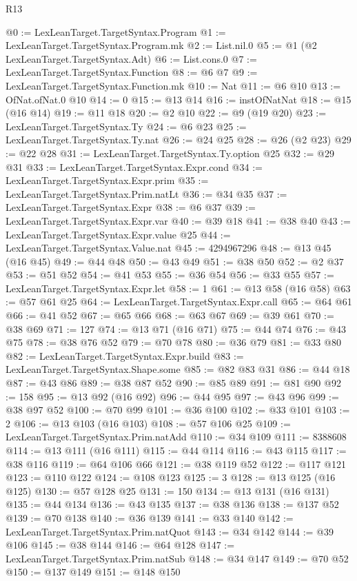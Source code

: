 \begin{lexlean}{R13}
\begin{coremodule}
@0 := LexLeanTarget.TargetSyntax.Program
@1 := LexLeanTarget.TargetSyntax.Program.mk
@2 := List.nil.{0}
@5 := @1 (@2 LexLeanTarget.TargetSyntax.Adt)
@6 := List.cons.{0}
@7 := LexLeanTarget.TargetSyntax.Function
@8 := @6 @7
@9 := LexLeanTarget.TargetSyntax.Function.mk
@10 := Nat
@11 := @6 @10
@13 := OfNat.ofNat.{0} @10
@14 := 0
@15 := @13 @14
@16 := instOfNatNat
@18 := @15 (@16 @14)
@19 := @11 @18
@20 := @2 @10
@22 := @9 (@19 @20)
@23 := LexLeanTarget.TargetSyntax.Ty
@24 := @6 @23
@25 := LexLeanTarget.TargetSyntax.Ty.nat
@26 := @24 @25
@28 := @26 (@2 @23)
@29 := @22 @28
@31 := LexLeanTarget.TargetSyntax.Ty.option @25
@32 := @29 @31
@33 := LexLeanTarget.TargetSyntax.Expr.cond
@34 := LexLeanTarget.TargetSyntax.Expr.prim
@35 := LexLeanTarget.TargetSyntax.Prim.natLt
@36 := @34 @35
@37 := LexLeanTarget.TargetSyntax.Expr
@38 := @6 @37
@39 := LexLeanTarget.TargetSyntax.Expr.var
@40 := @39 @18
@41 := @38 @40
@43 := LexLeanTarget.TargetSyntax.Expr.value @25
@44 := LexLeanTarget.TargetSyntax.Value.nat
@45 := 4294967296
@48 := @13 @45 (@16 @45)
@49 := @44 @48
@50 := @43 @49
@51 := @38 @50
@52 := @2 @37
@53 := @51 @52
@54 := @41 @53
@55 := @36 @54
@56 := @33 @55
@57 := LexLeanTarget.TargetSyntax.Expr.let
@58 := 1
@61 := @13 @58 (@16 @58)
@63 := @57 @61 @25
@64 := LexLeanTarget.TargetSyntax.Expr.call
@65 := @64 @61
@66 := @41 @52
@67 := @65 @66
@68 := @63 @67
@69 := @39 @61
@70 := @38 @69
@71 := 127
@74 := @13 @71 (@16 @71)
@75 := @44 @74
@76 := @43 @75
@78 := @38 @76 @52
@79 := @70 @78
@80 := @36 @79
@81 := @33 @80
@82 := LexLeanTarget.TargetSyntax.Expr.build
@83 := LexLeanTarget.TargetSyntax.Shape.some
@85 := @82 @83 @31
@86 := @44 @18
@87 := @43 @86
@89 := @38 @87 @52
@90 := @85 @89
@91 := @81 @90
@92 := 158
@95 := @13 @92 (@16 @92)
@96 := @44 @95
@97 := @43 @96
@99 := @38 @97 @52
@100 := @70 @99
@101 := @36 @100
@102 := @33 @101
@103 := 2
@106 := @13 @103 (@16 @103)
@108 := @57 @106 @25
@109 := LexLeanTarget.TargetSyntax.Prim.natAdd
@110 := @34 @109
@111 := 8388608
@114 := @13 @111 (@16 @111)
@115 := @44 @114
@116 := @43 @115
@117 := @38 @116
@119 := @64 @106 @66
@121 := @38 @119 @52
@122 := @117 @121
@123 := @110 @122
@124 := @108 @123
@125 := 3
@128 := @13 @125 (@16 @125)
@130 := @57 @128 @25
@131 := 150
@134 := @13 @131 (@16 @131)
@135 := @44 @134
@136 := @43 @135
@137 := @38 @136
@138 := @137 @52
@139 := @70 @138
@140 := @36 @139
@141 := @33 @140
@142 := LexLeanTarget.TargetSyntax.Prim.natQuot
@143 := @34 @142
@144 := @39 @106
@145 := @38 @144
@146 := @64 @128
@147 := LexLeanTarget.TargetSyntax.Prim.natSub
@148 := @34 @147
@149 := @70 @52
@150 := @137 @149
@151 := @148 @150

\end{coremodule}
\end{lexlean}

